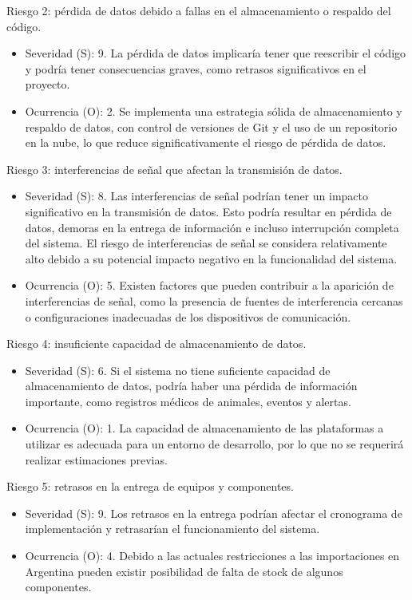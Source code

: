 \documentclass[
11pt, %
]{charter}
\begin{document}
Riesgo 2: pérdida de datos debido a fallas en el almacenamiento o respaldo del código.
\begin{itemize}
	\item Severidad (S): 9. La pérdida de datos implicaría tener que reescribir el código y podría tener consecuencias graves, como retrasos significativos en el proyecto.
	\item Ocurrencia (O): 2. Se implementa una estrategia sólida de almacenamiento y respaldo de datos, con control de versiones de Git y el uso de un repositorio en la nube, lo que reduce significativamente el riesgo de pérdida de datos. 
\end{itemize}

Riesgo 3: interferencias de señal que afectan la transmisión de datos.
\begin{itemize}
	\item Severidad (S): 8. Las interferencias de señal podrían tener un impacto significativo en la transmisión de datos. Esto podría resultar en pérdida de datos, demoras en la entrega de información e incluso interrupción completa del sistema. El riesgo de interferencias de señal se considera relativamente alto debido a su potencial impacto negativo en la funcionalidad del sistema.
	\item Ocurrencia (O): 5. Existen factores que pueden contribuir a la aparición de interferencias de señal, como la presencia de fuentes de interferencia cercanas o configuraciones inadecuadas de los dispositivos de comunicación.
\end{itemize}

Riesgo 4: insuficiente capacidad de almacenamiento de datos.
\begin{itemize}
	\item Severidad (S): 6. Si el sistema no tiene suficiente capacidad de almacenamiento de datos, podría haber una pérdida de información importante, como registros médicos de animales, eventos y alertas.
	\item Ocurrencia (O): 1. La capacidad de almacenamiento de las plataformas a utilizar es adecuada para un entorno de desarrollo, por lo que no se requerirá realizar estimaciones previas.
\end{itemize}

Riesgo 5: retrasos en la entrega de equipos y componentes.
\begin{itemize}
	\item Severidad (S): 9. Los retrasos en la entrega podrían afectar el cronograma de implementación y retrasarían el funcionamiento del sistema.
	\item Ocurrencia (O): 4. Debido a las actuales restricciones a las importaciones en Argentina pueden existir posibilidad de falta de stock de algunos componentes.
\end{itemize}
\end{document}

